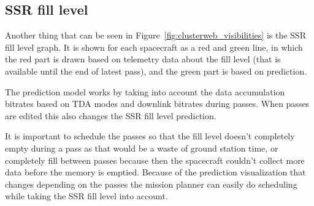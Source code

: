 \subsection{SSR fill level}
Another thing that can be seen in Figure~\ref{fig:clusterweb_visibilities} is the SSR fill level graph. It is shown for each spacecraft as a red and green line, in which the red part is drawn based on telemetry data about the fill level (that is available until the end of latest pass), and the green part is based on prediction. 

The prediction model works by taking into account the data accumulation bitrates based on TDA modes and downlink bitrates during passes. When passes are edited this also changes the SSR fill level prediction. 

It is important to schedule the passes so that the fill level doesn't completely empty during a pass as that would be a waste of ground station time, or completely fill between passes because then the spacecraft couldn't collect more data before the memory is emptied. Because of the prediction visualization that changes depending on the passes the mission planner can easily do scheduling while taking the SSR fill level into account.
